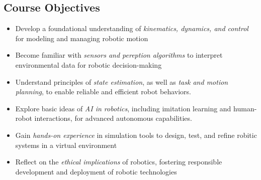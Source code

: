 \documentclass[10pt]{article}
\begin{document}
\subsection*{Course Objectives}
\begin{itemize}
    \item Develop a foundational understanding of \textit{kinematics, dynamics, and control} for modeling and managing robotic motion
    \item Become familiar with \textit{sensors and pereption algorithms} to interpret environmental data for robotic decision-making
    \item Understand principles of \textit{state estimation}, as well as \textit{task and motion planning}, to enable reliable and efficient robot behaviors.
    \item Explore basic ideas of \textit{AI in robotics}, including imitation learning and human-robot interactions, for advanced autonomous capabilities.
    \item Gain \textit{hands-on experience} in simulation tools to design, test, and refine robitic systems in a virtual environment
    \item Reflect on the \textit{ethical implications} of robotics, fostering responsible development and deployment of robotic technologies
\end{itemize}
\end{document}
